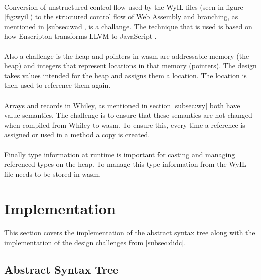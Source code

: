 \paragraph{}
Conversion of unstructured control flow used by the WyIL files (seen in figure \ref{fig:wyil}) to the structured control flow of Web Assembly and branching, as mentioned in \ref{subsec:wad}, is a challange. The technique that is used is based on how Enscripton transforms LLVM to JavaScript \cite{Zakai:2011:ELC:2048147.2048224}.

\paragraph{}
Also a challenge is the heap and pointers in wasm are addressable memory (the heap) and integers that represent locations in that memory (pointers). The design takes values intended for the heap and assigns them a location. The location is then used to reference them again. 

\paragraph{}
Arrays and records in Whiley, as mentioned in section \ref{subsec:wy} both have value semantics.%
 The challenge is to ensure that these semantics are not changed when compiled from Whiley to wasm. To ensure this, every time a reference is assigned or used in a method a copy is created. 


\paragraph{}
Finally type information at runtime is important for casting and managing referenced types on the heap. To manage this type information from the WyIL file needs to be stored in wasm. %


\section{Implementation}

This section covers the implementation of the abstract syntax tree along with the implementation of the design challenges from \ref{subsec:didc}.

\subsection{Abstract Syntax Tree}

